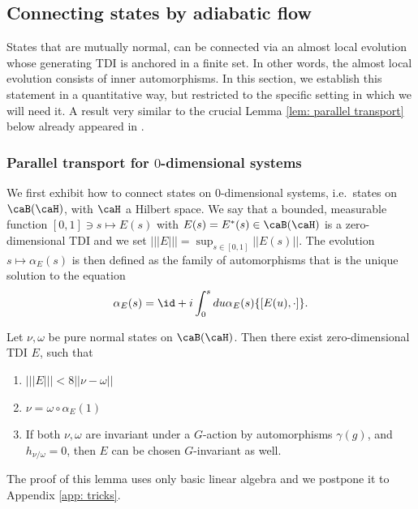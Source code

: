 \subsection{Connecting states by adiabatic flow}

States that are mutually normal, can be connected via an almost local evolution whose generating TDI is anchored in a finite set. In other words, the almost local evolution consists of inner automorphisms. In this section, we establish this statement in a quantitative way, but restricted to the specific setting in which we will need it.  A result very similar to the crucial Lemma \ref{lem: parallel transport} below already appeared in \cite{kapustin2021classification}. 


\subsubsection{Parallel transport for $0$-dimensional systems}\label{Parallel in 0d}

We first exhibit how to connect states on $0$-dimensional systems, i.e.\ states on $\caB(\caH)$, with $\caH$ a Hilbert space. We say that a bounded, measurable function $[0,1]\ni s\mapsto E(s)$ with $E(s)=E^*(s)\in \caB(\caH) $ is a zero-dimensional TDI and we set $|||E|||=\sup_{s\in [0,1]} ||E(s)||$.
The evolution $s\mapsto \alpha_E(s)$ is then defined as the family of automorphisms that is the unique solution to the equation 
$$\alpha_E(s)=\id+i\int_0^sdu \alpha_E(s)\{[E(u),\cdot]\}.$$ 
\begin{lemma}\label{lem: parallel transport simple}
	Let $\nu,\omega$ be pure normal states on $\caB(\caH)$.
	Then there exist zero-dimensional TDI $E$, such that 
	\begin{enumerate}
		\item   $|||E||| < 8 || \nu-\omega ||$
		\item $\nu = \omega\circ \alpha_E(1)$
		\item  If both $\nu,\omega$ are invariant under a $G$-action by automorphisms $\gamma(g)$, and $h_{\nu/\omega}=0$, then $E$ can be chosen $G$-invariant as well.
	\end{enumerate}
\end{lemma}
The proof of this lemma uses only basic linear algebra and we postpone it to Appendix \ref{app: tricks}.



